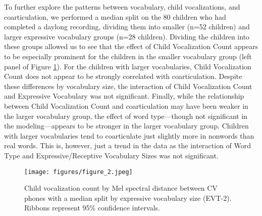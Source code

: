\documentclass[a4paper,man,natbib,donotrepeattitle, apacite]{apa6}
\begin{document}
To further explore the patterns between vocabulary, child vocalizations, and coarticulation, we performed a median split on the 80 children who had completed a daylong recording, dividing them into smaller (n=52 children) and larger expressive vocabulary groups (n=28 children). Dividing the children into these groups allowed us to see that the effect of Child Vocalization Count appears to be especially prominent for the children in the smaller vocabulary group (left panel of Figure \ref{fig:figure-2}). For the children with larger vocabularies, Child Vocalization Count does not appear to be strongly correlated with coarticulation. Despite these differences by vocabulary size, the interaction of Child Vocalization Count and Expressive Vocabulary was not significant.  Finally, while the relationship between Child Vocalization Count and coarticulation may have been weaker in the larger vocabulary group, the effect of word type---though not significant in the modeling---appears to be stronger in the larger vocabulary group. Children with larger vocabularies tend to coarticulate just slightly more in nonwords than real words. This is, however, just a trend in the data as the interaction of Word Type and Expressive/Receptive Vocabulary Sizes was not significant. 


\begin{figure}[H]
\centering
\texttt{[image: figures/figure\_2.jpeg]}
\caption{\label{fig:figure-2}Child vocalization count by Mel spectral distance between CV phones with a median split by expressive vocabulary size (EVT-2). Ribbons represent 95\% confidence intervals.}
\end{figure}
\end{document}
